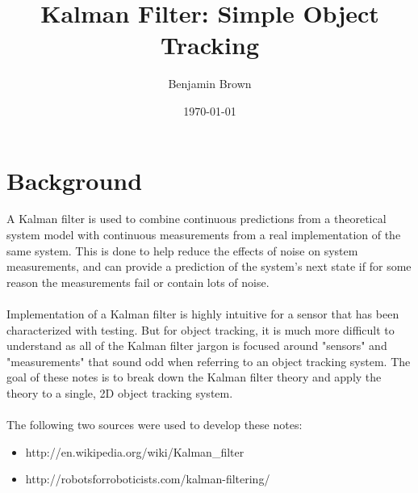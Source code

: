 \documentclass{article} %
\begin{document}
\title {Kalman Filter: Simple Object Tracking}
\author{Benjamin Brown}
\date{\today}
\maketitle
\section{Background}
A Kalman filter is used to combine continuous predictions from a theoretical system model with continuous measurements from a real implementation of the same system. This is done to help reduce the effects of noise on system measurements, and can provide a prediction of the system's next state if for some reason the measurements fail or contain lots of noise. \\\\
Implementation of a Kalman filter is highly intuitive for a sensor that has been characterized with testing. But for object tracking, it is much more difficult to understand as all of the Kalman filter jargon is focused around "sensors" and "measurements" that sound odd when referring to an object tracking system. The goal of these notes is to break down the Kalman filter theory and apply the theory to a single, 2D object tracking system. \\\\
The following two sources were used to develop these notes:
\begin{itemize}
\item http://en.wikipedia.org/wiki/Kalman\_filter
\item http://robotsforroboticists.com/kalman-filtering/
\end{itemize}
\end{document}
